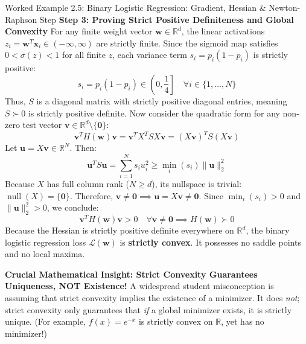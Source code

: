 \begin{examplebox}[breakable]{Worked Example 2.5: Binary Logistic Regression: Gradient, Hessian \& Newton-Raphson Step}
\textbf{Step 3: Proving Strict Positive Definiteness and Global Convexity}
For any finite weight vector $\mathbf{w} \in \mathbb{R}^d$, the linear activations $z_i = \mathbf{w}^T \mathbf{x}_i \in (-\infty, \infty)$ are strictly finite.
Since the sigmoid map satisfies $0 < \sigma(z) < 1$ for all finite $z$, each variance term $s_i = p_i(1 - p_i)$ is strictly positive:
\begin{equation*}
s_i = p_i(1 - p_i) \in \left(0, \frac{1}{4}\right] \quad \forall i \in \{1, \dots, N\}
\end{equation*}
Thus, $S$ is a diagonal matrix with strictly positive diagonal entries, meaning $S \succ 0$ is strictly positive definite.
Now consider the quadratic form for any non-zero test vector $\mathbf{v} \in \mathbb{R}^d \setminus \{\mathbf{0}\}$:
\begin{equation*}
\mathbf{v}^T H(\mathbf{w}) \mathbf{v} = \mathbf{v}^T X^T S X \mathbf{v} = (X\mathbf{v})^T S (X\mathbf{v})
\end{equation*}
Let $\mathbf{u} = X\mathbf{v} \in \mathbb{R}^N$. Then:
\begin{equation*}
\mathbf{u}^T S \mathbf{u} = \sum_{i=1}^N s_i u_i^2 \ge \min_{i} (s_i) \|\mathbf{u}\|_2^2
\end{equation*}
Because $X$ has full column rank ($N \ge d$), its nullspace is trivial: $\operatorname{null}(X) = \{\mathbf{0}\}$.
Therefore, $\mathbf{v} \ne \mathbf{0} \implies \mathbf{u} = X\mathbf{v} \ne \mathbf{0}$.
Since $\min_i(s_i) > 0$ and $\|\mathbf{u}\|_2^2 > 0$, we conclude:
\begin{equation*}
\mathbf{v}^T H(\mathbf{w}) \mathbf{v} > 0 \quad \forall \mathbf{v} \ne \mathbf{0} \implies H(\mathbf{w}) \succ 0
\end{equation*}
Because the Hessian is strictly positive definite everywhere on $\mathbb{R}^d$, the binary logistic regression loss $\mathcal{L}(\mathbf{w})$ is \textbf{strictly convex}. It possesses no saddle points and no local maxima.

\textbf{Crucial Mathematical Insight: Strict Convexity Guarantees Uniqueness, NOT Existence!}
A widespread student misconception is assuming that strict convexity implies the existence of a minimizer. It does \emph{not}; strict convexity only guarantees that \emph{if} a global minimizer exists, it is strictly unique. (For example, $f(x) = e^{-x}$ is strictly convex on $\mathbb{R}$, yet has no minimizer!)


\end{examplebox}
